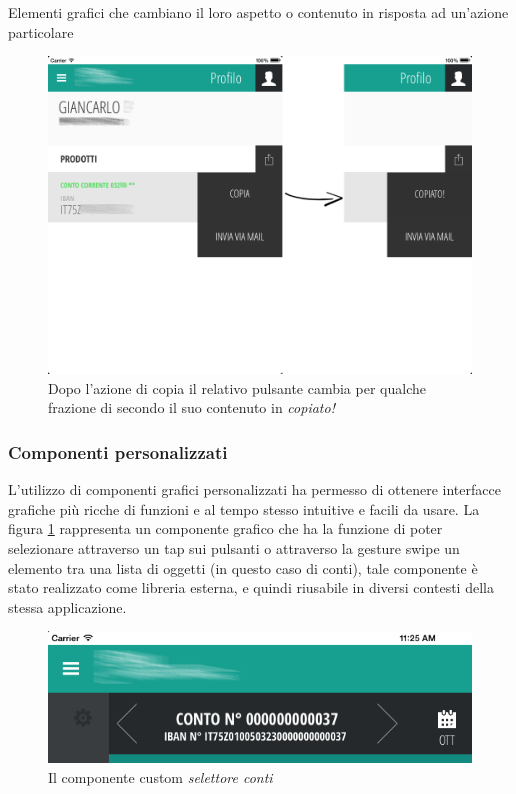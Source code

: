 Elementi grafici che cambiano il loro aspetto o contenuto in risposta ad un'azione particolare
\begin{figure}[htbp]
\centering
\includegraphics[scale=0.30]{ux/copia.png}
\caption{Dopo l'azione di copia il relativo pulsante cambia per qualche frazione di secondo il suo contenuto in \emph{copiato!}}
\end{figure}

\newpage
\subsubsection{Componenti personalizzati}
L'utilizzo di componenti grafici personalizzati ha permesso di ottenere interfacce grafiche più ricche di funzioni e al tempo stesso intuitive e facili da usare. La figura \ref{fig:selettore} rappresenta un componente grafico che ha la funzione di poter selezionare attraverso un tap sui pulsanti o attraverso la gesture swipe un elemento tra una lista di oggetti (in questo caso di conti), tale componente è stato realizzato come libreria esterna, e quindi riusabile in diversi contesti della stessa applicazione.
\begin{figure}[htbp]
\centering
\includegraphics[scale=0.50]{ux/selettore.png}

\caption{Il componente custom \emph{selettore conti}}
\label{fig:selettore}
\end{figure}

